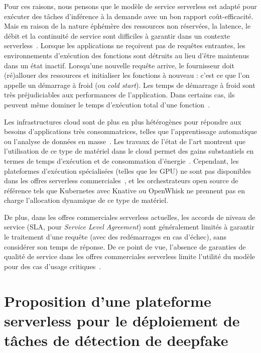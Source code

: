 Pour ces raisons, nous pensons que le modèle de service serverless est adapté pour exécuter des tâches d'inférence à la demande avec un bon rapport coût-efficacité. Mais en raison de la nature éphémère des ressources non réservées, la latence, le débit et la continuité de service sont difficiles à garantir dans un contexte serverless~\cite{vaneykSPECRGCloud2018, dartoisCuckooOpportunisticMapReduce2019}. Lorsque les applications ne reçoivent pas de requêtes entrantes, les environnements d'exécution des fonctions sont détruits au lieu d'être maintenus dans un état inactif. Lorsqu'une nouvelle requête arrive, le fournisseur doit (ré)allouer des ressources et initialiser les fonctions à nouveau : c'est ce que l'on appelle un démarrage à froid (ou \textit{cold start}). Les temps de démarrage à froid sont très préjudiciables aux performances de l'application. Dans certains cas, ils peuvent même dominer le temps d'exécution total d'une fonction~\cite{mullerLambadaInteractiveData2020}.

Les infrastructures cloud sont de plus en plus hétérogènes pour répondre aux besoins d'applications très consommatrices, telles que l'apprentissage automatique ou l'analyse de données en masse~\cite{reissHeterogeneityDynamicityClouds}. Les travaux de l'état de l'art montrent que l'utilisation de ce type de matériel dans le cloud permet des gains substantiels en termes de temps d'exécution et de consommation d'énergie~\cite{10.1145/3369583.3392679, 9195730}. Cependant, les plateformes d'exécution spécialisées (telles que les GPU) ne sont pas disponibles dans les offres serverless commerciales~\cite{khandelwalTaureauDeconstructingServerless2020}, et les orchestrateurs open source de référence tels que Kubernetes avec Knative ou OpenWhisk ne prennent pas en charge l'allocation dynamique de ce type de matériel.

De plus, dans les offres commerciales serverless actuelles, les accords de niveau de service (SLA, pour \textit{Service Level Agreement}) sont généralement limités à garantir le traitement d'une requête (avec des redémarrages en cas d'échec), sans considérer son temps de réponse. De ce point de vue, l'absence de garanties de qualité de service dans les offres commerciales serverless limite l'utilité du modèle pour des cas d'usage critiques~\cite{buyyaSLAorientedResourceProvisioning2011}.

\section{Proposition d'une plateforme serverless pour le déploiement de tâches de détection de deepfake}
\label{section:herofake-deepfake}

